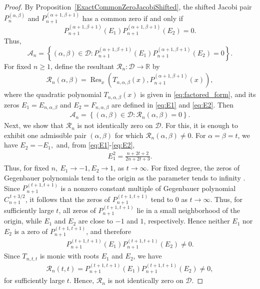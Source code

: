 \documentclass[final,3p,times,12pt]{elsarticle}
\numberwithin{equation}{section}  %
\begin{document}
	\begin{proof} By Proposition~\ref{ExactCommonZeroJacobiShifted}, the shifted Jacobi pair
		$P_n^{(\alpha,\beta)}$ and $P_{n+1}^{(\alpha+1,\beta+1)}$ has a common zero
		if and only if
		\begin{equation*}
			P_{n+1}^{(\alpha+1,\beta+1)}(E_1)
			P_{n+1}^{(\alpha+1,\beta+1)}(E_2)=0.
		\end{equation*}
		Thus,
		\begin{equation*}
			\mathcal{A}_n
			=
			\left\{
			(\alpha,\beta)\in\mathcal{D}:
			P_{n+1}^{(\alpha+1,\beta+1)}(E_1)
			P_{n+1}^{(\alpha+1,\beta+1)}(E_2)=0
			\right\}.
		\end{equation*}
		For fixed $n\geq1$, define the resultant $\mathcal{R}_n: \mathcal{D}\rightarrow \mathbb{R}$ by
		\begin{align*}
			\mathcal{R}_n(\alpha,\beta)
			=
			\operatorname{Res}_x
			\left(
			T_{n,\alpha,\beta}(x),
			P_{n+1}^{(\alpha+1,\beta+1)}(x)
			\right),
		\end{align*}
		where the quadratic polynomial $T_{n,\alpha,\beta}(x)$ is given in \eqref{eq:factored_form}, and its zeros  $E_1=E_{n,\alpha,\beta}$ and $E_2=F_{n,\alpha,\beta}$ are defined
		in \eqref{eq:E1} and \eqref{eq:E2}. Then	\begin{align*}
			\mathcal A_n
			=
			\left\{
			(\alpha,\beta)\in\mathcal{D}:
			\mathcal{R}_n(\alpha,\beta)=0
			\right\}.
		\end{align*}
		Next, we show that $\mathcal{R}_n$ is not identically zero on $\mathcal{D}$. For this,	it is enough to exhibit one admissible pair $(\alpha,\beta)$ for which
		$\mathcal{R}_n(\alpha,\beta)\neq0$. 	For $\alpha=\beta=t$, we have $	E_2=-E_1,$
		and, from \eqref{eq:E1}-\eqref{eq:E2},
		\begin{align*}
			E_1^2
			=
			\frac{n+2t+2}{2n+2t+3}.
		\end{align*}
		Thus, for fixed $n,~ E_1\longrightarrow -1,	E_2\longrightarrow 1$,
		as $t\to\infty.$	For fixed degree, the zeros of Gegenbauer polynomials tend to the origin
		as the parameter tends to infinity \cite[page 169]{Temme-Specialfunctions1996}. Since
		$P_{n+1}^{(t+1,t+1)}$ is a nonzero constant multiple of Gegenbauer polynomial
		$C_{n+1}^{\,t+3/2}$, it follows that the zeros of
		$P_{n+1}^{(t+1,t+1)}$ tend to $0$ as $t\to\infty$. %
			Thus, for sufficiently large $t$, all zeros of
		$P_{n+1}^{(t+1,t+1)}$ lie in a small neighborhood of the origin, while
		$E_1$ and $E_2$ are close to $-1$ and $1$, respectively. Hence neither
		$E_1$ nor $E_2$ is a zero of $P_{n+1}^{(t+1,t+1)}$, and therefore
		\begin{align*}
			P_{n+1}^{(t+1,t+1)}(E_1)
			P_{n+1}^{(t+1,t+1)}(E_2)
			\neq0.
		\end{align*}
		Since $T_{n,t,t}$ is monic with roots $E_1$ and $E_2$, we have
		\begin{align*}
			\mathcal{R}_n(t,t)
			=
			P_{n+1}^{(t+1,t+1)}(E_1)
			P_{n+1}^{(t+1,t+1)}(E_2)
			\neq0,
		\end{align*}
		for sufficiently large $t$.
		Hence, $\mathcal{R}_n$ is not identically zero on
		$\mathcal{D}$.
		

\end{proof}
\end{document}
